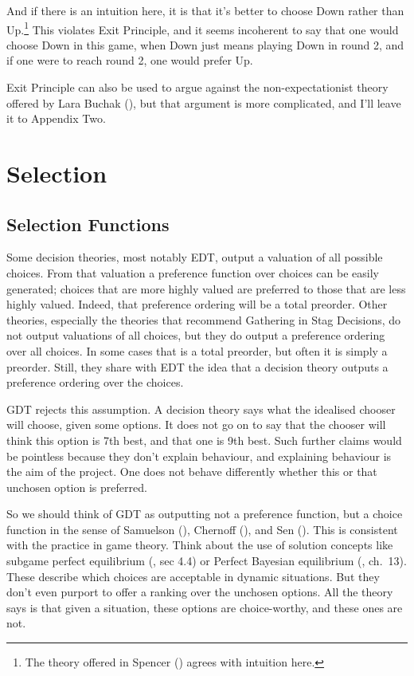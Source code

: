 \documentclass[
  12pt,
  letterpaper,
  DIV=11,
  numbers=noendperiod]{scrreprt}
\begin{document}
\newpage

And if there is an intuition here, it is that it's better to choose Down
rather than Up.\footnote{The theory offered in Spencer
  () agrees with intuition here.} This
violates Exit Principle, and it seems incoherent to say that one would
choose Down in this game, when Down just means playing Down in round 2,
and if one were to reach round 2, one would prefer Up.

Exit Principle can also be used to argue against the non-expectationist
theory offered by Lara Buchak (), but
that argument is more complicated, and I'll leave it to Appendix Two.


\chapter{Selection}\label{sec-select}

\section{Selection Functions}\label{sec-selection-functions}

Some decision theories, most notably EDT, output a valuation of all
possible choices. From that valuation a preference function over choices
can be easily generated; choices that are more highly valued are
preferred to those that are less highly valued. Indeed, that preference
ordering will be a total preorder. Other theories, especially the
theories that recommend Gathering in Stag Decisions, do not output
valuations of all choices, but they do output a preference ordering over
all choices. In some cases that is a total preorder, but often it is
simply a preorder. Still, they share with EDT the idea that a decision
theory outputs a preference ordering over the choices.

GDT rejects this assumption. A decision theory says what the idealised
chooser will choose, given some options. It does not go on to say that
the chooser will think this option is 7th best, and that one is 9th
best. Such further claims would be pointless because they don't explain
behaviour, and explaining behaviour is the aim of the project. One does
not behave differently whether this or that unchosen option is
preferred.

So we should think of GDT as outputting not a preference function, but a
choice function in the sense of Samuelson
(), Chernoff
(), and Sen
(). This is consistent with the practice in
game theory. Think about the use of solution concepts like subgame
perfect equilibrium (, sec 4.4)
or Perfect Bayesian equilibrium (, ch.~13). These describe which choices are acceptable in dynamic
situations. But they don't even purport to offer a ranking over the
unchosen options. All the theory says is that given a situation, these
options are choice-worthy, and these ones are not.
\end{document}
